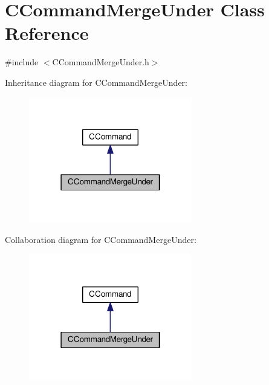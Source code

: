 \hypertarget{classCCommandMergeUnder}{}\section{C\+Command\+Merge\+Under Class Reference}
\label{classCCommandMergeUnder}


{\ttfamily \#include $<$C\+Command\+Merge\+Under.\+h$>$}



Inheritance diagram for C\+Command\+Merge\+Under\+:\nopagebreak
\begin{figure}[H]
\begin{center}
\leavevmode
\includegraphics[width=202pt]{classCCommandMergeUnder__inherit__graph}
\end{center}
\end{figure}


Collaboration diagram for C\+Command\+Merge\+Under\+:\nopagebreak
\begin{figure}[H]
\begin{center}
\leavevmode
\includegraphics[width=202pt]{classCCommandMergeUnder__coll__graph}
\end{center}
\end{figure}
